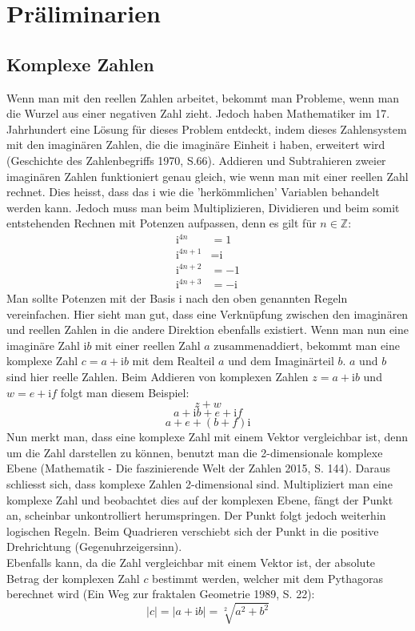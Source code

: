 \section{Präliminarien}
\subsection{Komplexe Zahlen}
Wenn man mit den reellen Zahlen arbeitet, bekommt man Probleme, wenn man die Wurzel aus einer negativen Zahl zieht. Jedoch haben Mathematiker im 17. Jahrhundert eine Lösung für dieses Problem entdeckt, indem dieses Zahlensystem mit den imaginären Zahlen, die die imaginäre Einheit i haben, erweitert wird (Geschichte des Zahlenbegriffs 1970, S.66). Addieren und Subtrahieren zweier imaginären Zahlen funktioniert genau gleich, wie wenn man mit einer reellen Zahl rechnet. Dies heisst, dass das i wie die 'herkömmlichen' Variablen behandelt werden kann. Jedoch muss man beim Multiplizieren, Dividieren und beim somit entstehenden Rechnen mit Potenzen aufpassen, denn es gilt für $n \in \mathbb{Z}$:
\begin{align*}
\text{i}^{4n} &= 1 \\
\text{i}^{4n+1} &= \text{i} \\
\text{i}^{4n+2} &= -1 \\
\text{i}^{4n+3} &= -\text{i}
\end{align*}
Man sollte Potenzen mit der Basis i nach den oben genannten Regeln vereinfachen. Hier sieht man gut, dass eine Verknüpfung zwischen den imaginären und reellen Zahlen in die andere Direktion ebenfalls existiert. Wenn man nun eine imaginäre Zahl $\text{i}b$ mit einer reellen Zahl $a$ zusammenaddiert, bekommt man eine komplexe Zahl  $c=a+\text{i}b$ mit dem Realteil $a$ und dem Imaginärteil $b$. $a$ und $b$ sind hier reelle Zahlen. Beim Addieren von komplexen Zahlen $z=a+\text{i}b$ und $w=e+\text{i}f$ folgt man diesem Beispiel:
\[z+w\]
\[a+\text{i}b+e+\text{i}f\]
\[a+e+(b+f)\text{i}\]
Nun merkt man, dass eine komplexe Zahl mit einem Vektor vergleichbar ist, denn um die Zahl darstellen zu können, benutzt man die 2-dimensionale komplexe Ebene (Mathematik - Die faszinierende Welt der Zahlen 2015, S. 144). Daraus schliesst sich, dass komplexe Zahlen 2-dimensional sind. Multipliziert man eine komplexe Zahl und beobachtet dies auf der komplexen Ebene, fängt der Punkt an, scheinbar unkontrolliert herumspringen. Der Punkt folgt jedoch weiterhin logischen Regeln. Beim Quadrieren verschiebt sich der Punkt in die positive Drehrichtung (Gegenuhrzeigersinn).
\\
Ebenfalls kann, da die Zahl vergleichbar mit einem Vektor ist, der absolute Betrag der komplexen Zahl $c$ bestimmt werden, welcher mit dem Pythagoras berechnet wird (Ein Weg zur fraktalen Geometrie 1989, S. 22):
\[|c| = |a+\text{i}b| = \sqrt[2]{a^2+b^2}\]

